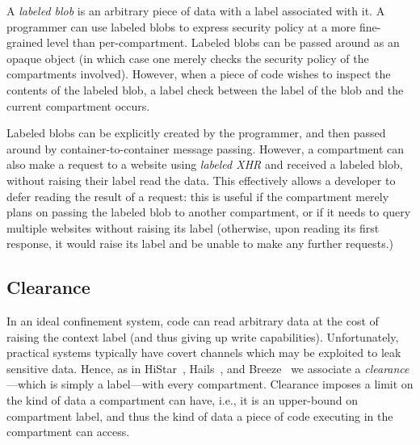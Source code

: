 A \emph{labeled blob} is an arbitrary piece of data with a label
associated with it.
%
A programmer can use labeled blobs to express security policy at
a more fine-grained level than per-compartment.
%
Labeled blobs can be passed around as an opaque object (in which case one merely
checks the security policy of the compartments involved).
%
However, when a piece of code wishes to inspect the contents of the
labeled blob, a label check between the label of the blob and the
current compartment occurs.

Labeled blobs can be explicitly created by the programmer, and then
passed around by container-to-container message passing.
%
However, a compartment can also make a request to a website using
\emph{labeled XHR} and received a labeled blob, without raising their
label read the data.
%
This effectively allows a developer to defer reading the result of
a request: this is useful if the compartment merely plans on passing
the labeled blob to another compartment, or if it needs to query
multiple websites without raising its label (otherwise, upon reading
its first response, it would raise its label and be unable to
make any further requests.)



\subsection{Clearance}
\label{sec:clearance}

In an ideal confinement system, code can read arbitrary data at the
cost of raising the context label (and thus giving up write
capabilities).
%
Unfortunately, practical systems typically have covert channels which
may be exploited to leak sensitive data.
%
Hence, as in HiStar~\cite{Zeldovich:2006}, Hails~\cite{giffin:2012:hails}, and
Breeze~\cite{Breeze13} we associate a \emph{clearance}---which is
simply a label---with every compartment.
%
Clearance imposes a limit on the kind of data a compartment can have,
i.e., it is an upper-bound on compartment label, and thus the kind of
data a piece of code executing in the compartment can access.


